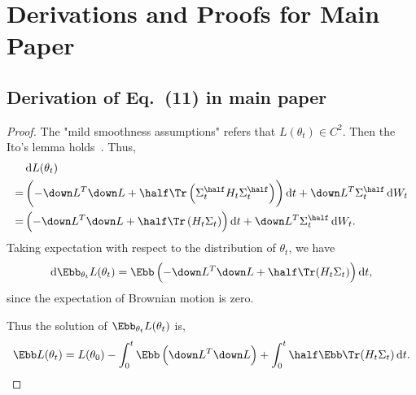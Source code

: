 \documentclass{article}
\begin{document}




\appendix
\section{Derivations and Proofs for Main Paper}

\subsection{Derivation of Eq.~(11) in main paper}
\begin{proof}
The "mild smoothness assumptions" refers that $L(\theta_t) \in C^2$.
Then the Ito's lemma holds~\citep{oksendal2003stochastic}. Thus,
\begin{align}
    &\dif L(\theta_t) \\
    =& \left(-\down L^T \down L + \half \Tr \left(\Sigma_t^{\half}H_t\Sigma_t^{\half}\right) \right) \dif t
    + \down L^T \Sigma_t^{\half} \dif W_t \\
    =& \left(-\down L^T \down L + \half \Tr \left(H_t\Sigma_t\right) \right) \dif t
    + \down L^T \Sigma_t^{\half} \dif W_t.
\end{align}
Taking expectation with respect to the distribution of $\theta_t$, we have
\begin{equation}
    \dif \Ebb_{\theta_t} L(\theta_t) = \Ebb \left( -\down L^T \down L + \half \Tr (H_t \Sigma_t)\right) \dif t,
\end{equation}
since the expectation of Brownian motion is zero.

Thus the solution of $\Ebb_{\theta_t} L(\theta_t)$ is,
\begin{equation}
    \Ebb L(\theta_t) = L(\theta_0) - \int_{0}^{t} \Ebb \left(\down L^T \down L\right)
    + \int_{0}^{t} \half \Ebb \Tr (H_t\Sigma_t) \dif t.
\end{equation}
\end{proof}
\end{document}
